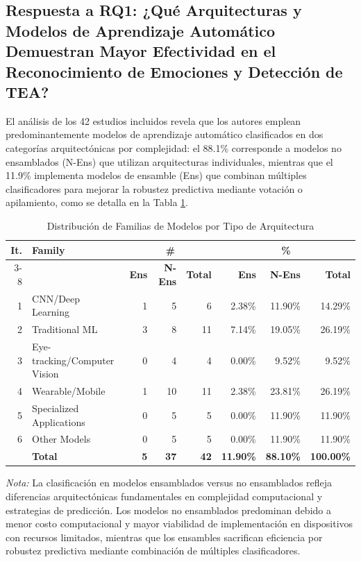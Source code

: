 \documentclass{ieeeaccess}
\begin{document}
	\subsection{Respuesta a RQ1: ¿Qué Arquitecturas y Modelos de Aprendizaje Automático Demuestran Mayor Efectividad en el Reconocimiento de Emociones y Detección de TEA?}
	
	El análisis de los 42 estudios incluidos revela que los autores emplean predominantemente modelos de aprendizaje automático clasificados en dos categorías arquitectónicas por complejidad: el 88.1\% corresponde a modelos no ensamblados (N-Ens) que utilizan arquitecturas individuales, mientras que el 11.9\% implementa modelos de ensamble (Ens) que combinan múltiples clasificadores para mejorar la robustez predictiva mediante votación o apilamiento, como se detalla en la Tabla \ref{tab:familias}.
	
	\begin{table}[htbp]
		\caption{Distribución de Familias de Modelos por Tipo de Arquitectura}
		\label{tab:familias}
		\centering
		\begin{tabular}{|r|l|r|r|r|r|r|r|}
			\hline
			\textbf{It.} & \textbf{Family} & \multicolumn{3}{c|}{\textbf{\#}} & \multicolumn{3}{c|}{\textbf{\%}} \\
			\cline{3-8}
			& & \textbf{Ens} & \textbf{N-Ens} & \textbf{Total} & \textbf{Ens} & \textbf{N-Ens} & \textbf{Total} \\
			\hline
			1 & CNN/Deep Learning & 1 & 5 & 6 & 2.38\% & 11.90\% & 14.29\% \\
			2 & Traditional ML & 3 & 8 & 11 & 7.14\% & 19.05\% & 26.19\% \\
			3 & Eye-tracking/Computer Vision & 0 & 4 & 4 & 0.00\% & 9.52\% & 9.52\% \\
			4 & Wearable/Mobile & 1 & 10 & 11 & 2.38\% & 23.81\% & 26.19\% \\
			5 & Specialized Applications & 0 & 5 & 5 & 0.00\% & 11.90\% & 11.90\% \\
			6 & Other Models & 0 & 5 & 5 & 0.00\% & 11.90\% & 11.90\% \\
			\hline
			& \textbf{Total} & \textbf{5} & \textbf{37} & \textbf{42} & \textbf{11.90\%} & \textbf{88.10\%} & \textbf{100.00\%} \\
			\hline
		\end{tabular}
		\begin{flushleft}
			\small \textit{Nota:} La clasificación en modelos ensamblados versus no ensamblados refleja diferencias arquitectónicas fundamentales en complejidad computacional y estrategias de predicción. Los modelos no ensamblados predominan debido a menor costo computacional y mayor viabilidad de implementación en dispositivos con recursos limitados, mientras que los ensambles sacrifican eficiencia por robustez predictiva mediante combinación de múltiples clasificadores.
		\end{flushleft}
	\end{table}
	
\end{document}
